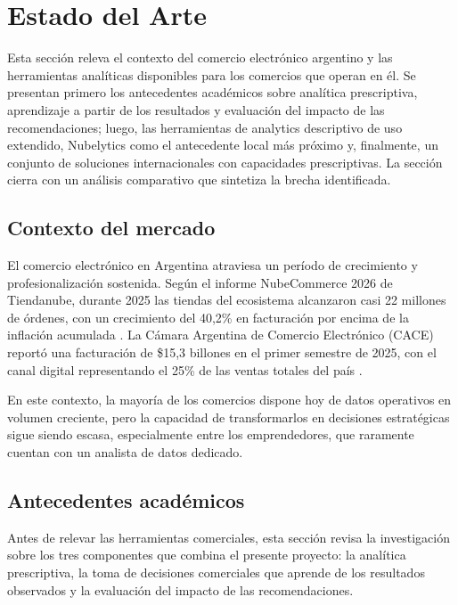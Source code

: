 \section{Estado del Arte}
\label{sec:estado-arte}

Esta sección releva el contexto del comercio electrónico argentino y las herramientas analíticas disponibles para los comercios que operan en él. Se presentan primero los antecedentes académicos sobre analítica prescriptiva, aprendizaje a partir de los resultados y evaluación del impacto de las recomendaciones; luego, las herramientas de analytics descriptivo de uso extendido, Nubelytics como el antecedente local más próximo y, finalmente, un conjunto de soluciones internacionales con capacidades prescriptivas. La sección cierra con un análisis comparativo que sintetiza la brecha identificada.

\subsection{Contexto del mercado}
\label{sec:contexto-mercado}

El comercio electrónico en Argentina atraviesa un período de crecimiento y profesionalización sostenida. Según el informe NubeCommerce 2026 de Tiendanube, durante 2025 las tiendas del ecosistema alcanzaron casi 22 millones de órdenes, con un crecimiento del 40,2\% en facturación por encima de la inflación acumulada \parencite{Tiendanube2026}. La Cámara Argentina de Comercio Electrónico (CACE) reportó una facturación de \$15,3 billones en el primer semestre de 2025, con el canal digital representando el 25\% de las ventas totales del país \parencite{CACE2025}.

En este contexto, la mayoría de los comercios dispone hoy de datos operativos en volumen creciente, pero la capacidad de transformarlos en decisiones estratégicas sigue siendo escasa, especialmente entre los emprendedores, que raramente cuentan con un analista de datos dedicado.

\subsection{Antecedentes académicos}
\label{sec:antecedentes-academicos}

Antes de relevar las herramientas comerciales, esta sección revisa la investigación sobre los tres componentes que combina el presente proyecto: la analítica prescriptiva, la toma de decisiones comerciales que aprende de los resultados observados y la evaluación del impacto de las recomendaciones.


